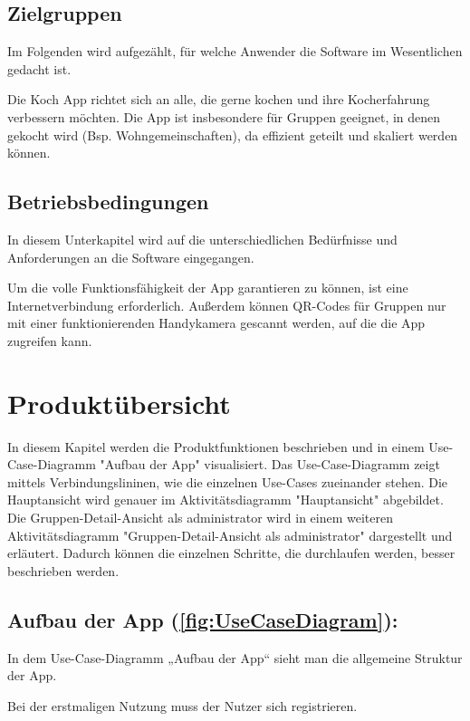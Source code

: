 \documentclass[parskip=full]{scrartcl}
\begin{document}
\subsection{Zielgruppen}
Im Folgenden wird aufgezählt, für welche Anwender die Software im Wesentlichen gedacht ist. \par
Die Koch App richtet sich an alle, die gerne kochen und ihre Kocherfahrung verbessern möchten.
Die App ist insbesondere für Gruppen geeignet, in denen gekocht wird (Bsp. Wohngemeinschaften), da  effizient geteilt und skaliert werden können.

\subsection{Betriebsbedingungen}
In diesem Unterkapitel wird auf die unterschiedlichen Bedürfnisse und Anforderungen an die Software eingegangen. \par
Um die volle Funktionsfähigkeit der App garantieren zu können, ist eine Internetverbindung erforderlich. Außerdem können QR-Codes für Gruppen nur mit einer funktionierenden Handykamera gescannt werden, auf die die App zugreifen kann.

\newpage
\section{Produktübersicht}

In diesem Kapitel werden die Produktfunktionen beschrieben und in einem Use-Case-Diagramm "Aufbau der App" visualisiert.
Das Use-Case-Diagramm zeigt mittels Verbindungslininen, wie die einzelnen Use-Cases zueinander stehen.
Die Hauptansicht wird genauer im Aktivitätsdiagramm "Hauptansicht" abgebildet.
Die Gruppen-Detail-Ansicht als \Gls{administrator} wird in einem weiteren Aktivitätsdiagramm "Gruppen-Detail-Ansicht als \Gls{administrator}" dargestellt und erläutert.
Dadurch können die einzelnen Schritte, die durchlaufen werden, besser beschrieben werden.\par


\subsection{Aufbau der App (\autoref{fig:UseCaseDiagram}):}

In dem Use-Case-Diagramm „Aufbau der App“ sieht man die allgemeine Struktur der App.

Bei der erstmaligen Nutzung muss der Nutzer sich registrieren.
\end{document}
